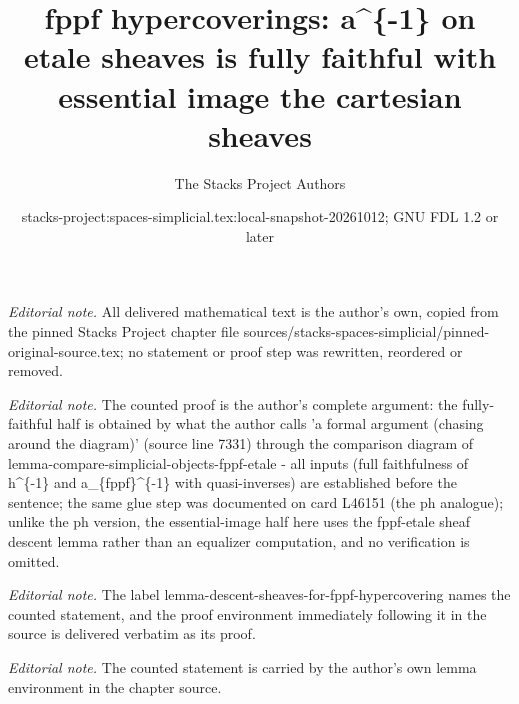 \documentclass{stacks-project}
\title{fppf hypercoverings: a\textasciicircum{}\{-1\} on etale sheaves is fully faithful with essential image the cartesian sheaves}
\author{The Stacks Project Authors}
\date{stacks-project:spaces-simplicial.tex:local-snapshot-20261012; GNU FDL 1.2 or later}
\theoremstyle{plain}
\theoremstyle{definition}
\theoremstyle{remark}
\numberwithin{equation}{subsection}
\begin{document}
\maketitle
\noindent\textit{Editorial note.} All delivered mathematical text is the author's own, copied from the pinned Stacks Project chapter file sources/stacks-spaces-simplicial/pinned-original-source.tex; no statement or proof step was rewritten, reordered or removed.\par\medskip
\noindent\textit{Editorial note.} The counted proof is the author's complete argument: the fully-faithful half is obtained by what the author calls 'a formal argument (chasing around the diagram)' (source line 7331) through the comparison diagram of lemma-compare-simplicial-objects-fppf-etale - all inputs (full faithfulness of h\textasciicircum{}\{-1\} and a\_\{fppf\}\textasciicircum{}\{-1\} with quasi-inverses) are established before the sentence; the same glue step was documented on card L46151 (the ph analogue); unlike the ph version, the essential-image half here uses the fppf-etale sheaf descent lemma rather than an equalizer computation, and no verification is omitted.\par\medskip
\noindent\textit{Editorial note.} The label lemma-descent-sheaves-for-fppf-hypercovering names the counted statement, and the proof environment immediately following it in the source is delivered verbatim as its proof.\par\medskip
\noindent\textit{Editorial note.} The counted statement is carried by the author's own lemma environment in the chapter source.\par\medskip
\end{document}
